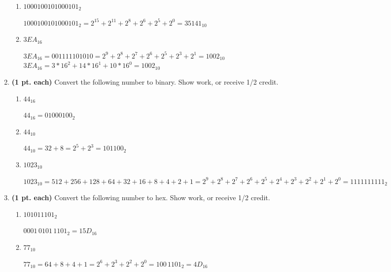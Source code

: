 \begin{enumerate}
\begin{enumerate}
	\item $1000100101000101_2$
	\begin{onlysolution}	\itshape $1000100101000101_2=2^{15}+2^{11}+2^8+2^6+2^5+2^0=35141_{10}$\end{onlysolution}
	
	\item $3EA_{16}$
	\begin{onlysolution}	\itshape$3EA_{16}=0011 1110 1010 = 2^9+2^8+2^7+2^6+2^5+2^3+2^1=1002_{10}$\\ {\color{blue} $3EA_{16} = 3*16^2 +14*16^1 + 10 * 16^0 = 1002_{10} $}\end{onlysolution}
	
     \end{enumerate}


\item \textbf{ (1 pt. each)} Convert the following number to binary. Show 
work, or receive 1/2 credit.
	\begin{enumerate}
	\item $44_{16}$
	\begin{onlysolution}	\itshape $44_{16} =0100 0100_2$\end{onlysolution}
	
	\item $44_{10}$
	\begin{onlysolution}	\itshape $44_{10} = 32+8 = 2^5+2^3=101100_2$\end{onlysolution}
	
	\item $1023_{10}$
	\begin{onlysolution}	\itshape$1023_{10} = 512+256+128+64+32+16+8+4+2+1=
        2^9+2^8+2^7+2^6+2^5+2^4+2^3+2^2+2^1+2^0=1111111111_2$\end{onlysolution}
        
	\end{enumerate}


\item \textbf{ (1 pt. each)} Convert the following number to hex. Show work, or receive 1/2 credit.
	\begin{enumerate}
	
	\item $101011101_2$
	\begin{onlysolution}	{\color{blue} \itshape$0001\, 0101\, 1101_2 = 15D_{16}$} \end{onlysolution}
	
	\item $77_{10}$
	\begin{onlysolution}	\itshape $77_{10} = 64+8+4+1=2^6+2^3+2^2+2^0=100\, 1101_2=4D_{16}$ \end{onlysolution}
	

\end{enumerate}
\end{enumerate}
